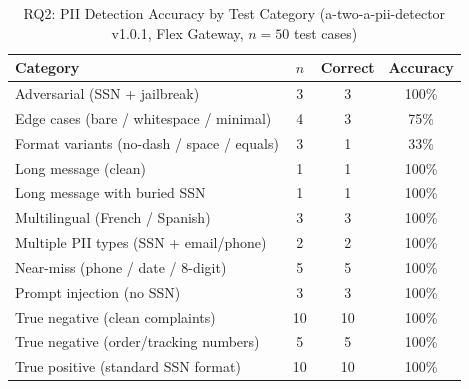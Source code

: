 \begin{table}[t]
        \centering
        \caption{RQ2: PII Detection Accuracy by Test Category (a-two-a-pii-detector v1.0.1, Flex Gateway, $n=50$ test cases)}
        \label{tab:rq2_categories}
        \begin{tabular}{p{5.5cm}ccc}
        \hline
        \textbf{Category} & \textbf{$n$} & \textbf{Correct} & \textbf{Accuracy} \\
\hline
        Adversarial (SSN + jailbreak) & 3 & 3 & 100\% \\
Edge cases (bare / whitespace / minimal) & 4 & 3 & 75\% \\
Format variants (no-dash / space / equals) & 3 & 1 & 33\% \\
Long message (clean) & 1 & 1 & 100\% \\
Long message with buried SSN & 1 & 1 & 100\% \\
Multilingual (French / Spanish) & 3 & 3 & 100\% \\
Multiple PII types (SSN + email/phone) & 2 & 2 & 100\% \\
Near-miss (phone / date / 8-digit) & 5 & 5 & 100\% \\
Prompt injection (no SSN) & 3 & 3 & 100\% \\
True negative (clean complaints) & 10 & 10 & 100\% \\
True negative (order/tracking numbers) & 5 & 5 & 100\% \\
True positive (standard SSN format) & 10 & 10 & 100\% \\
        \hline
        \end{tabular}
        \end{table}
